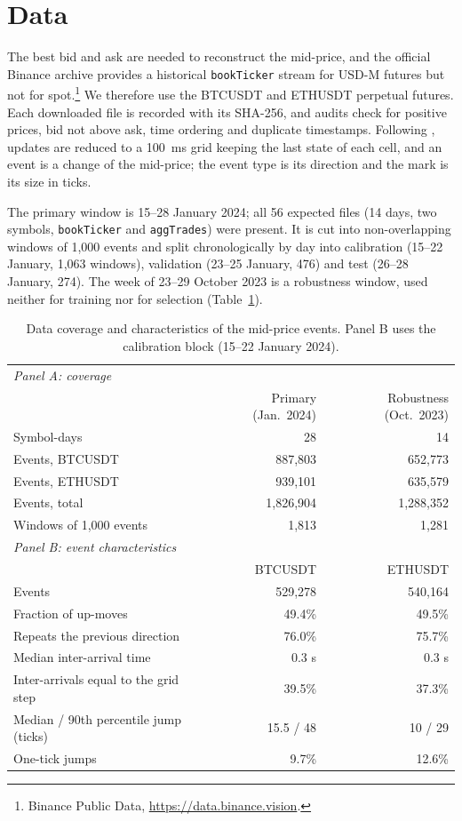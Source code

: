 \documentclass[preprint,12pt,authoryear]{elsarticle}
\begin{document}
\section{Data}
\label{sec:data}

The best bid and ask are needed to reconstruct the mid-price, and the official Binance
archive provides a historical \texttt{bookTicker} stream for USD-M futures but not for
spot.\footnote{Binance Public Data, \url{https://data.binance.vision}.} We therefore use the
BTCUSDT and ETHUSDT perpetual futures. Each downloaded file is recorded with its SHA-256, and audits check for
positive prices, bid not above ask, time ordering and duplicate timestamps. Following
\citet{lee2023}, updates are reduced to a 100~ms grid keeping the last state of each cell,
and an event is a change of the mid-price; the event type is its direction and the mark is
its size in ticks.

The primary window is 15--28 January 2024; all 56 expected files (14 days, two symbols,
\texttt{bookTicker} and \texttt{aggTrades}) were present. It is cut into non-overlapping
windows of 1,000 events and split chronologically by day into calibration (15--22 January,
1,063 windows), validation (23--25 January, 476) and test (26--28 January, 274). The week of
23--29 October 2023 is a robustness window, used neither for training nor for selection
(Table~\ref{tab:data}).

\begin{table}[t]
\centering
\caption{Data coverage and characteristics of the mid-price events. Panel B uses the
calibration block (15--22 January 2024).}
\label{tab:data}
\small
\begin{tabular}{lrr}
\toprule
\multicolumn{3}{l}{\emph{Panel A: coverage}}\\
 & Primary (Jan.\ 2024) & Robustness (Oct.\ 2023)\\
\midrule
Symbol-days & 28 & 14\\
Events, BTCUSDT & 887,803 & 652,773\\
Events, ETHUSDT & 939,101 & 635,579\\
Events, total & 1,826,904 & 1,288,352\\
Windows of 1,000 events & 1,813 & 1,281\\
\midrule
\multicolumn{3}{l}{\emph{Panel B: event characteristics}}\\
 & BTCUSDT & ETHUSDT\\
\midrule
Events & 529,278 & 540,164\\
Fraction of up-moves & 49.4\% & 49.5\%\\
Repeats the previous direction & 76.0\% & 75.7\%\\
Median inter-arrival time & 0.3 s & 0.3 s\\
Inter-arrivals equal to the grid step & 39.5\% & 37.3\%\\
Median / 90th percentile jump (ticks) & 15.5 / 48 & 10 / 29\\
One-tick jumps & 9.7\% & 12.6\%\\
\bottomrule
\end{tabular}
\end{table}
\end{document}
